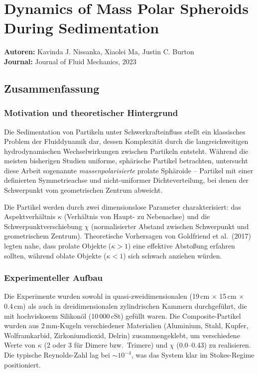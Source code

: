 \documentclass[a4paper,12pt]{article}
\begin{document}
\section*{Dynamics of Mass Polar Spheroids During Sedimentation}
\textbf{Autoren:} Kavinda J. Nissanka, Xiaolei Ma, Justin C. Burton \\
\textbf{Journal:} Journal of Fluid Mechanics, 2023

\subsection*{Zusammenfassung}

\subsubsection*{Motivation und theoretischer Hintergrund}
Die Sedimentation von Partikeln unter Schwerkrafteinfluss stellt ein klassisches Problem der Fluiddynamik dar, dessen Komplexität durch die langreichweitigen hydrodynamischen Wechselwirkungen zwischen Partikeln entsteht. Während die meisten bisherigen Studien uniforme, sphärische Partikel betrachten, untersucht diese Arbeit sogenannte \emph{massenpolarisierte} prolate Sphäroide -- Partikel mit einer definierten Symmetrieachse und nicht-uniformer Dichteverteilung, bei denen der Schwerpunkt vom geometrischen Zentrum abweicht.

Die Partikel werden durch zwei dimensionslose Parameter charakterisiert: das Aspektverhältnis $\kappa$ (Verhältnis von Haupt- zu Nebenachse) und die Schwerpunktverschiebung $\chi$ (normalisierter Abstand zwischen Schwerpunkt und geometrischem Zentrum). Theoretische Vorhersagen von Goldfriend et al.\ (2017) legten nahe, dass prolate Objekte ($\kappa > 1$) eine effektive Abstoßung erfahren sollten, während oblate Objekte ($\kappa < 1$) sich schwach anziehen würden.

\subsubsection*{Experimenteller Aufbau}
Die Experimente wurden sowohl in quasi-zweidimensionalen (19\,cm $\times$ 15\,cm $\times$ 0.4\,cm) als auch in dreidimensionalen zylindrischen Kammern durchgeführt, die mit hochviskosem Silikonöl (10\,000\,cSt) gefüllt waren. Die Composite-Partikel wurden aus 2\,mm-Kugeln verschiedener Materialien (Aluminium, Stahl, Kupfer, Wolframkarbid, Zirkoniumdioxid, Delrin) zusammengeklebt, um verschiedene Werte von $\kappa$ (2 oder 3 für Dimere bzw.\ Trimere) und $\chi$ (0.0--0.43) zu realisieren. Die typische Reynolds-Zahl lag bei $\sim 10^{-4}$, was das System klar im Stokes-Regime positioniert.
\end{document}
